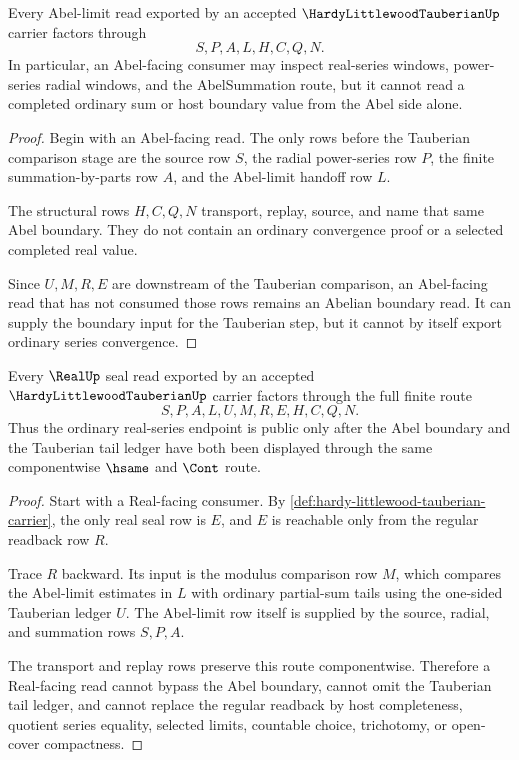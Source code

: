 \begin{theorem}
\label{thm:hardy-littlewood-tauberian-abelian-boundary}
Every Abel-limit read exported by an accepted $\HardyLittlewoodTauberianUp$ carrier factors through
$$
S,P,A,L,H,C,Q,N.
$$
In particular, an Abel-facing consumer may inspect real-series windows, power-series radial windows, and the AbelSummation route, but it cannot read a completed ordinary sum or host boundary value from the Abel side alone.
\end{theorem}
\begin{proof}
Begin with an Abel-facing read. The only rows before the Tauberian comparison stage are the source row $S$, the radial power-series row $P$, the finite summation-by-parts row $A$, and the Abel-limit handoff row $L$.

The structural rows $H,C,Q,N$ transport, replay, source, and name that same Abel boundary. They do not contain an ordinary convergence proof or a selected completed real value.

Since $U,M,R,E$ are downstream of the Tauberian comparison, an Abel-facing read that has not consumed those rows remains an Abelian boundary read. It can supply the boundary input for the Tauberian step, but it cannot by itself export ordinary series convergence.
\end{proof}

\begin{theorem}
\label{thm:hardy-littlewood-tauberian-real-seal}
Every $\RealUp$ seal read exported by an accepted $\HardyLittlewoodTauberianUp$ carrier factors through the full finite route
$$
S,P,A,L,U,M,R,E,H,C,Q,N.
$$
Thus the ordinary real-series endpoint is public only after the Abel boundary and the Tauberian tail ledger have both been displayed through the same componentwise $\hsame$ and $\Cont$ route.
\end{theorem}
\begin{proof}
Start with a Real-facing consumer. By \autoref{def:hardy-littlewood-tauberian-carrier}, the only real seal row is $E$, and $E$ is reachable only from the regular readback row $R$.

Trace $R$ backward. Its input is the modulus comparison row $M$, which compares the Abel-limit estimates in $L$ with ordinary partial-sum tails using the one-sided Tauberian ledger $U$. The Abel-limit row itself is supplied by the source, radial, and summation rows $S,P,A$.

The transport and replay rows preserve this route componentwise. Therefore a Real-facing read cannot bypass the Abel boundary, cannot omit the Tauberian tail ledger, and cannot replace the regular readback by host completeness, quotient series equality, selected limits, countable choice, trichotomy, or open-cover compactness.
\end{proof}

